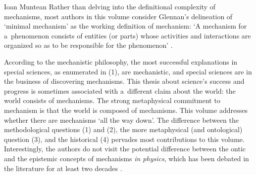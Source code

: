 \begin{recengenv}{Ioan Muntean}
Rather than delving into the definitional complexity of mechanisms, most authors in this volume consider Glennan's delineation of ‘minimal mechanism' as the working definition of mechanism: ‘A mechanism for a~phenomenon consists of entities (or parts) whose activities and interactions are organized so as to be responsible for the phenomenon'
\parencite[][p.17]{illari_routledge_2017}.%


According to the mechanistic philosophy, the most successful explanations in special sciences, as enumerated in (1), are mechanistic, and special sciences are in the business of discovering mechanisms. This thesis about science's success and progress is sometimes associated with a~different claim about the world: the world consists of mechanisms. The strong metaphysical commitment to mechanism is that the world is composed of mechanisms. This volume addresses whether there are mechanisms ‘all the way down'. The difference between the methodological questions (1) and (2), the more metaphysical (and ontological) question (3), and the historical (4) pervades most contributions to this volume. Interestingly, the authors do not visit the potential difference between the ontic and the epistemic concepts of mechanisms \textit{in physics}, which has been debated in the literature for at least two decades
\parencites{salmon_scientific_1984}{glennan_rethinking_2002}{wright_mechanistic_2012}{illari_mechanistic_2013}.


\end{recengenv}
